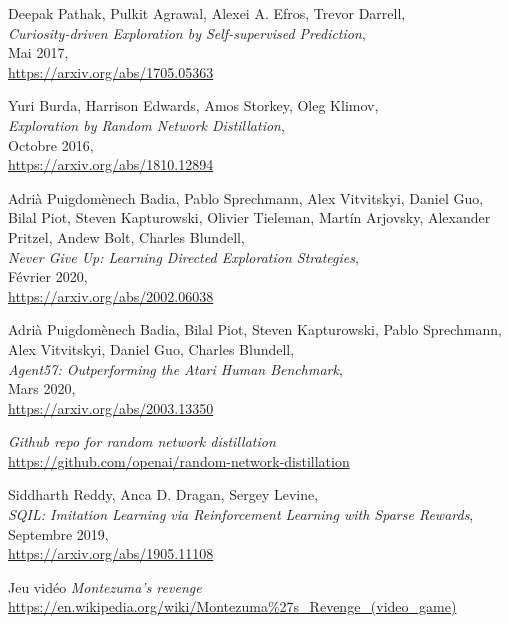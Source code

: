 \documentclass[a4paper,12pt]{report}
\begin{document}
\begin{thebibliography}{9}
	  Deepak Pathak, Pulkit Agrawal, Alexei A. Efros, Trevor Darrell,\\
	  \textit{Curiosity-driven Exploration by Self-supervised Prediction},\\
	  Mai 2017,\\
	  \url{https://arxiv.org/abs/1705.05363}

	 Yuri Burda, Harrison Edwards, Amos Storkey, Oleg Klimov,\\
	  \textit{Exploration by Random Network Distillation},\\
	  Octobre 2016,\\
	  \url{https://arxiv.org/abs/1810.12894}

	 Adrià Puigdomènech Badia, Pablo Sprechmann, Alex Vitvitskyi, Daniel Guo, Bilal Piot, Steven Kapturowski, Olivier Tieleman, Martín Arjovsky, Alexander Pritzel, Andew Bolt, Charles Blundell,\\
	  \textit{Never Give Up: Learning Directed Exploration Strategies},\\
	  Février 2020,\\
	  \url{https://arxiv.org/abs/2002.06038}

	 Adrià Puigdomènech Badia, Bilal Piot, Steven Kapturowski, Pablo Sprechmann, Alex Vitvitskyi, Daniel Guo, Charles Blundell,\\
	  \textit{Agent57: Outperforming the Atari Human Benchmark},\\
	  Mars 2020,\\
	  \url{https://arxiv.org/abs/2003.13350}

	  \textit{Github repo for random network distillation}\\
	  \url{https://github.com/openai/random-network-distillation}

	  Siddharth Reddy, Anca D. Dragan, Sergey Levine,\\
	  \textit{SQIL: Imitation Learning via Reinforcement Learning with Sparse Rewards},\\
	  Septembre 2019,\\
	  \url{https://arxiv.org/abs/1905.11108}

	Jeu vidéo \textit{Montezuma's revenge}\\
	\url{https://en.wikipedia.org/wiki/Montezuma%27s_Revenge_(video_game)}
\end{thebibliography}
\end{document}
